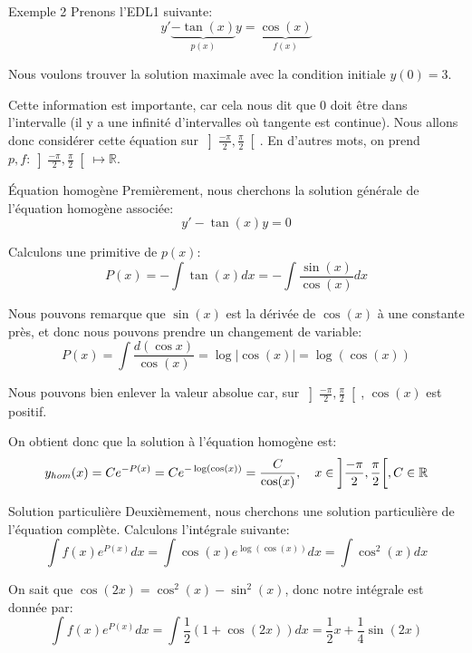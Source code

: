 \documentclass[a4paper]{article}
\begin{document}
\begin{parag}{Exemple 2}
    Prenons l'EDL1 suivante: 
    \[y' \underbrace{- \tan\left(x\right)}_{p\left(x\right)} y = \underbrace{\cos\left(x\right)}_{f\left(x\right)}\]

    Nous voulons trouver la solution maximale avec la condition initiale $y\left(0\right) = 3$.

    Cette information est importante, car cela nous dit que 0 doit être dans l'intervalle (il y a une infinité d'intervalles où tangente est continue). Nous allons donc considérer cette équation sur $\left]\frac{-\pi}{2}, \frac{\pi}{2}\right[ $. En d'autres mots, on prend $p, f : \left] \frac{-\pi}{2}, \frac{\pi}{2}\right[ \mapsto \mathbb{R}$.

    \begin{subparag}{Équation homogène}
        Premièrement, nous cherchons la solution générale de l'équation homogène associée: 
        \[y' - \tan\left(x\right) y = 0\]

        Calculons une primitive de $p\left(x\right)$: 
        \[P\left(x\right) = - \int \tan\left(x\right)dx = -\int \frac{\sin\left(x\right)}{\cos\left(x\right)}dx\]
        
        Nous pouvons remarque que $\sin\left(x\right)$ est la dérivée de $\cos\left(x\right)$ à une constante près, et donc nous pouvons prendre un changement de variable:
        \[P\left(x\right) = \int \frac{d\left(\cos x\right)}{\cos\left(x\right)} = \log\left|\cos\left(x\right)\right| = \log\left(\cos\left(x\right)\right)\]

        Nous pouvons bien enlever la valeur absolue car, sur $\left]\frac{-\pi}{2}, \frac{\pi}{2}\right[ $, $\cos\left(x\right)$ est positif.

        On obtient donc que la solution à l'équation homogène est: 
        \[y_{hom}\left(x\right) = Ce^{-P\left(x\right)} = Ce^{-\log\left(\cos\left(x\right)\right)} = \frac{C}{\cos\left(x\right)}, \mathspace x \in \left] \frac{-\pi}{2}, \frac{\pi}{2}\right[, C \in \mathbb{R}\]
    \end{subparag}
    
    \begin{subparag}{Solution particulière}
        Deuxièmement, nous cherchons une solution particulière de l'équation complète. Calculons l'intégrale suivante: 
        \[\int f\left(x\right) e^{P\left(x\right)} dx = \int \cos\left(x\right) e^{\log\left(\cos\left(x\right)\right)} dx = \int \cos^2\left(x\right)dx\]
        
        On sait que $\cos\left(2x\right) = \cos^2\left(x\right) - \sin^2\left(x\right)$, donc notre intégrale est donnée par:
        \[\int f\left(x\right) e^{P\left(x\right)} dx = \int \frac{1}{2}\left(1 + \cos\left(2x\right)\right)dx = \frac{1}{2}x + \frac{1}{4} \sin\left(2x\right)\]


\end{subparag}
\end{parag}
\end{document}
